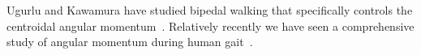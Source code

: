 \documentclass{llncs}
\begin{document}



Ugurlu and Kawamura have studied bipedal walking that
specifically controls the centroidal angular momentum~\cite{UK10}.
Relatively recently we have seen a comprehensive
study of angular momentum during human gait~\cite{HP08}.
\end{document}
